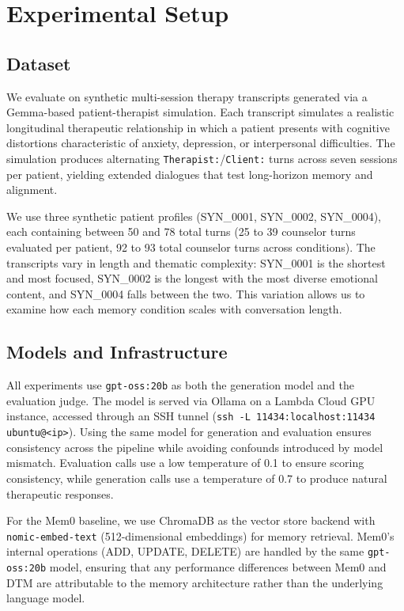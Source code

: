 \section{Experimental Setup}

\subsection{Dataset}

We evaluate on synthetic multi-session therapy transcripts generated via a Gemma-based patient-therapist simulation. Each transcript simulates a realistic longitudinal therapeutic relationship in which a patient presents with cognitive distortions characteristic of anxiety, depression, or interpersonal difficulties. The simulation produces alternating \texttt{Therapist:}/\texttt{Client:} turns across seven sessions per patient, yielding extended dialogues that test long-horizon memory and alignment.

We use three synthetic patient profiles (SYN\_0001, SYN\_0002, SYN\_0004), each containing between 50 and 78 total turns (25 to 39 counselor turns evaluated per patient, 92 to 93 total counselor turns across conditions). The transcripts vary in length and thematic complexity: SYN\_0001 is the shortest and most focused, SYN\_0002 is the longest with the most diverse emotional content, and SYN\_0004 falls between the two. This variation allows us to examine how each memory condition scales with conversation length.

\subsection{Models and Infrastructure}

All experiments use \texttt{gpt-oss:20b} as both the generation model and the evaluation judge. The model is served via Ollama on a Lambda Cloud GPU instance, accessed through an SSH tunnel (\texttt{ssh -L 11434:localhost:11434 ubuntu@<ip>}). Using the same model for generation and evaluation ensures consistency across the pipeline while avoiding confounds introduced by model mismatch. Evaluation calls use a low temperature of 0.1 to ensure scoring consistency, while generation calls use a temperature of 0.7 to produce natural therapeutic responses.

For the Mem0 baseline, we use ChromaDB as the vector store backend with \texttt{nomic-embed-text} (512-dimensional embeddings) for memory retrieval. Mem0's internal operations (ADD, UPDATE, DELETE) are handled by the same \texttt{gpt-oss:20b} model, ensuring that any performance differences between Mem0 and DTM are attributable to the memory architecture rather than the underlying language model.

